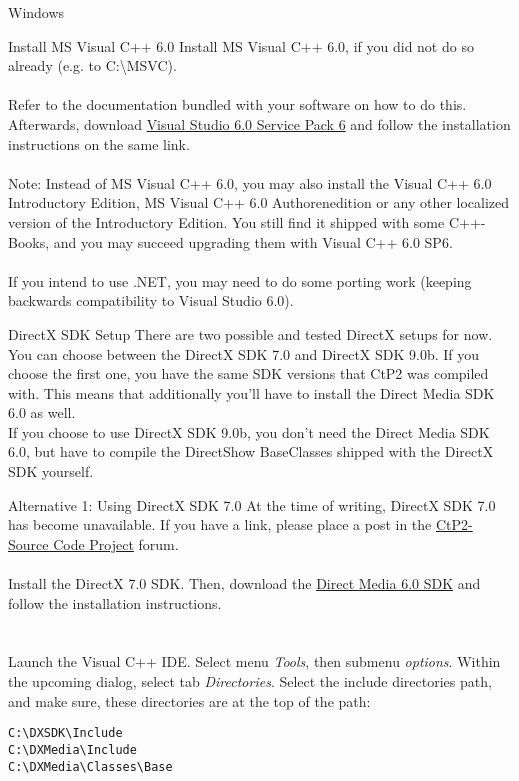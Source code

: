 \begin{section}{Windows}
\begin{subsection}{Install MS Visual C++ 6.0}
Install MS Visual C++ 6.0, if you did not do so already (e.g. to C:\textbackslash{}MSVC).\\
\\
Refer to the documentation bundled with your software on how to do this.
Afterwards, download \href{http://msdn.microsoft.com/vstudio/downloads/updates/sp/vs6/sp6/default.aspx}{Visual Studio 6.0 Service Pack 6} and follow the installation instructions on the same link.\\
\\
Note: Instead of MS Visual C++ 6.0, you may also install the Visual C++ 6.0 Introductory Edition, MS Visual C++ 6.0 Authorenedition or any other localized version of the Introductory Edition. You still find it shipped with some C++-Books, and you may succeed upgrading them with Visual C++ 6.0 SP6.\\
\\
If you intend to use .NET, you may need to do some porting work (keeping backwards compatibility to Visual Studio 6.0).
\end{subsection}%

\begin{subsection}{DirectX SDK Setup}
There are two possible and tested DirectX setups for now.\\
You can choose between the DirectX SDK 7.0 and DirectX SDK 9.0b. If you choose the first one, you have the same SDK versions that CtP2 was compiled with. This means that additionally you'll have to install the Direct Media SDK 6.0 as well.\\
If you choose to use DirectX SDK 9.0b, you don't need the Direct Media SDK 6.0, but have to compile the DirectShow BaseClasses shipped with the DirectX SDK yourself.

\begin{subsubsection}{Alternative 1: Using DirectX SDK 7.0}
At the time of writing, DirectX SDK 7.0 has become unavailable. If you have a link, please place a post in the \href{http://apolyton.net/forums/forumdisplay.php?s=&forumid=213}{CtP2-Source Code Project} forum.\\
\\
Install the DirectX 7.0 SDK. Then, download the \href{http://www.microsoft.com/downloads/details.aspx?FamilyId=FD044A42-9912-42A3-9A9E-D857199F888E&displaylang=en}{Direct Media 6.0 SDK} and follow the installation instructions.\\
\\
\\
Launch the Visual C++ IDE. Select menu \textit{Tools}, then submenu \textit{options}. Within the upcoming dialog, select tab \textit{Directories}. Select the include directories path, and make sure, these directories are at the top of the path:
\begin{verbatim}
C:\DXSDK\Include
C:\DXMedia\Include
C:\DXMedia\Classes\Base
\end{verbatim}


\end{subsubsection}
\end{subsection}
\end{section}
